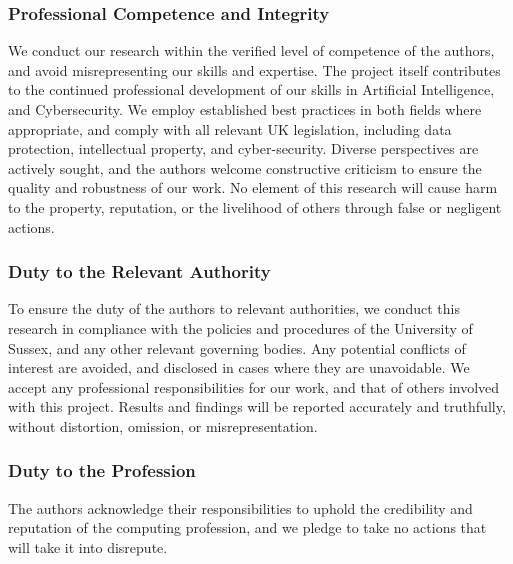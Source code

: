 \documentclass[main.tex]{subfiles}
\begin{document}
\subsubsection{Professional Competence and Integrity}

We conduct our research within the verified level of competence of the authors, and avoid misrepresenting our skills and expertise. The project itself contributes to the continued professional development of our skills in Artificial Intelligence, and Cybersecurity. We employ established best practices in both fields where appropriate, and comply with all relevant UK legislation, including data protection, intellectual property, and cyber-security. Diverse perspectives are actively sought, and the authors welcome constructive criticism to ensure the quality and robustness of our work. No element of this research will cause harm to the property, reputation, or the livelihood of others through false or negligent actions.

\subsubsection{Duty to the Relevant Authority}

To ensure the duty of the authors to relevant authorities, we conduct this research in compliance with the policies and procedures of the University of Sussex, and any other relevant governing bodies. Any potential conflicts of interest are avoided, and disclosed in cases where they are unavoidable. We accept any professional responsibilities for our work, and that of others involved with this project. Results and findings will be reported accurately and truthfully, without distortion, omission, or misrepresentation. 

\subsubsection{Duty to the Profession}
 

The authors acknowledge their responsibilities to uphold the credibility and reputation of the computing profession, and we pledge to take no actions that will take it into disrepute.
\end{document}
